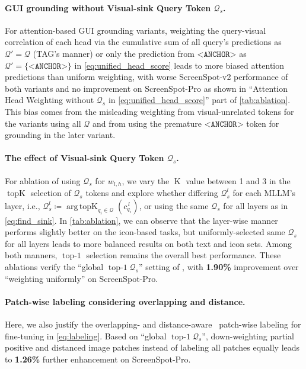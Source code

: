 \paragraph{GUI grounding without Visual-sink Query Token $\mathcal{Q}_s$.} For attention-based GUI grounding variants, weighting the query-visual correlation of each head via the cumulative sum of all query's predictions as $\mathcal{Q}'=\mathcal{Q}$ (TAG's manner) or only the prediction from $\texttt{<ANCHOR>}$ as $\mathcal{Q}'=\{\texttt{<ANCHOR>}\}$ in \cref{eq:unified_head_score} leads to more biased attention predictions than uniform weighting, with worse ScreenSpot-v2 performance of both variants and no improvement on ScreenSpot-Pro as shown in ``Attention Head Weighting without $\mathcal{Q}_s$ in \cref{eq:unified_head_score}'' part of \cref{tab:ablation}. This bias comes from the misleading weighting from visual-unrelated tokens for the variants using all $\mathcal{Q}$ and from using the premature $\texttt{<ANCHOR>}$ token for grounding in the later variant. 




\paragraph{The effect of Visual-sink Query Token $\mathcal{Q}_s$.} For ablation of using $\mathcal{Q}_s$ for $w_{l,h}$, we vary the $\operatorname{K}$ value between 1 and 3 in the $\operatorname{topK}$ selection of $\mathcal{Q}_s$ tokens and explore whether differing $\mathcal{Q}_s^l$ for each MLLM's layer, i.e., $\mathcal{Q}_s^l\coloneqq \operatorname*{arg\,topK}_{q_i\in\mathcal{Q}}(c_{q_i}^{\,l})$, or using the same $\mathcal{Q}_s$ for all layers as in \cref{eq:find_sink}. In \cref{tab:ablation}, we can observe that the layer-wise manner performs slightly better on the icon-based tasks, but uniformly-selected same $\mathcal{Q}_s$ for all layers leads to more balanced results on both text and icon sets. Among both manners, $\operatorname{top-1}$ selection remains the overall best performance. These ablations verify the ``global $\operatorname{top-1} \mathcal{Q}_s$'' setting of \method{}, with \textbf{1.90\%} improvement over ``weighting uniformly'' on ScreenSpot-Pro.

\paragraph{Patch-wise labeling considering overlapping and distance.} Here, we also justify the overlapping- and distance-aware~\citep{tang2025gui} patch-wise labeling for fine-tuning \method{} in \cref{eq:labeling}. Based on ``global $\operatorname{top-1} \mathcal{Q}_s$'', down-weighting partial positive and distanced image patches instead of labeling all patches equally leads to \textbf{1.26\%} further enhancement on ScreenSpot-Pro.

